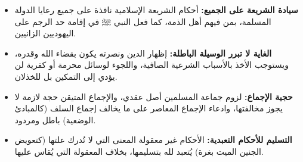 \begin{itemize}
    \item \textbf{سيادة الشريعة على الجميع:} أحكام الشريعة الإسلامية نافذة على جميع رعايا الدولة المسلمة، بمن فيهم أهل الذمة، كما فعل النبي ﷺ في إقامة حد الرجم على اليهوديين الزانيين.
    \item \textbf{الغاية لا تبرر الوسيلة الباطلة:} إظهار الدين ونصرته يكون بقضاء الله وقدره، ويستوجب الأخذ بالأسباب الشرعية الصافية، واللجوء لوسائل محرمة أو كفرية لن يؤدي إلى التمكين بل للخذلان.
    \item \textbf{حجية الإجماع:} لزوم جماعة المسلمين أصل عقدي، والإجماع المتيقن حجة لازمة لا يجوز مخالفتها، وادعاء الإجماع المعاصر على ما يخالف إجماع السلف (كالمبادئ الوضعية) باطل ومردود.
    \item \textbf{التسليم للأحكام التعبدية:} الأحكام غير معقولة المعنى التي لا تُدرك علتها (كتعويض الجنين الميت بغرة) يُتعبد لله بتسليمها، بخلاف المعقولة التي يُقاس عليها.
\end{itemize}

